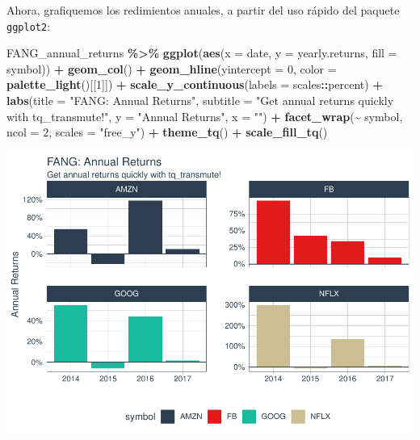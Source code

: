 \documentclass[
]{book}
\newenvironment{Shaded}{\begin{snugshade}}{\end{snugshade}}
\newcommand{\AttributeTok}[1]{\textcolor[rgb]{0.13,0.29,0.53}{#1}}
\newcommand{\DecValTok}[1]{\textcolor[rgb]{0.00,0.00,0.81}{#1}}
\newcommand{\FunctionTok}[1]{\textcolor[rgb]{0.13,0.29,0.53}{\textbf{#1}}}
\newcommand{\NormalTok}[1]{#1}
\newcommand{\SpecialCharTok}[1]{\textcolor[rgb]{0.81,0.36,0.00}{\textbf{#1}}}
\newcommand{\StringTok}[1]{\textcolor[rgb]{0.31,0.60,0.02}{#1}}
\begin{document}
Ahora, grafiquemos los redimientos anuales, a partir del uso rápido del paquete \texttt{ggplot2}:

\begin{Shaded}
\begin{Highlighting}[]
\NormalTok{FANG\_annual\_returns }\SpecialCharTok{\%\textgreater{}\%}
    \FunctionTok{ggplot}\NormalTok{(}\FunctionTok{aes}\NormalTok{(}\AttributeTok{x =}\NormalTok{ date, }\AttributeTok{y =}\NormalTok{ yearly.returns, }\AttributeTok{fill =}\NormalTok{ symbol)) }\SpecialCharTok{+}
    \FunctionTok{geom\_col}\NormalTok{() }\SpecialCharTok{+}
    \FunctionTok{geom\_hline}\NormalTok{(}\AttributeTok{yintercept =} \DecValTok{0}\NormalTok{, }\AttributeTok{color =} \FunctionTok{palette\_light}\NormalTok{()[[}\DecValTok{1}\NormalTok{]]) }\SpecialCharTok{+}
    \FunctionTok{scale\_y\_continuous}\NormalTok{(}\AttributeTok{labels =}\NormalTok{ scales}\SpecialCharTok{::}\NormalTok{percent) }\SpecialCharTok{+}
    \FunctionTok{labs}\NormalTok{(}\AttributeTok{title =} \StringTok{"FANG: Annual Returns"}\NormalTok{,}
         \AttributeTok{subtitle =} \StringTok{"Get annual returns quickly with tq\_transmute!"}\NormalTok{,}
         \AttributeTok{y =} \StringTok{"Annual Returns"}\NormalTok{, }\AttributeTok{x =} \StringTok{""}\NormalTok{) }\SpecialCharTok{+} 
    \FunctionTok{facet\_wrap}\NormalTok{(}\SpecialCharTok{\textasciitilde{}}\NormalTok{ symbol, }\AttributeTok{ncol =} \DecValTok{2}\NormalTok{, }\AttributeTok{scales =} \StringTok{"free\_y"}\NormalTok{) }\SpecialCharTok{+}
    \FunctionTok{theme\_tq}\NormalTok{() }\SpecialCharTok{+} 
    \FunctionTok{scale\_fill\_tq}\NormalTok{()}
\end{Highlighting}
\end{Shaded}

\begin{center}\includegraphics{Libro_TidyQualityTools_files/figure-latex/unnamed-chunk-58-1} \end{center}
\end{document}
